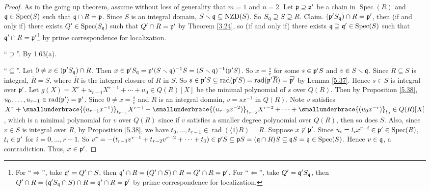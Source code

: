 \begin{proof}
    As in the going up theorem, assume without loss of generality that $m = 1$ and $n = 2$. Let $\mathfrak{p} \supseteq \mathfrak{p}'$ be a chain in $\operatorname{Spec}(R)$ and $\mathfrak{q} \in \operatorname{Spec}(S)$ such that $\mathfrak{q} \cap R = \mathfrak{p}$. Since $S$ is an integral domain, $S \smallsetminus \mathfrak{q} \subseteq \operatorname{NZD}(S)$. So $S_{\mathfrak{q}} \supseteq S \supseteq R$. Claim. $(\mathfrak{p}'S_{\mathfrak{q}}) \cap R = \mathfrak{p}'$, then (if and only if) there exists $Q' \in \operatorname{Spec}(S_{\mathfrak{q}})$ such that $Q' \cap R = \mathfrak{p}'$ by Theorem \ref{3.24}, so (if and only if) there exists $\mathfrak{q} \supseteq \mathfrak{q}' \in \operatorname{Spec}(S)$ such that $\mathfrak{q}' \cap R = \mathfrak{p}'$\footnote[2]{For ``$\Rightarrow$'', take $\mathfrak{q}' = Q' \cap S$, then $\mathfrak{q}' \cap R = (Q' \cap S) \cap R = Q' \cap R = \mathfrak{p}'$. For ``$\Leftarrow$'', take $Q' = \mathfrak{q}' S_{\mathfrak{q}}$, then $Q' \cap R = (\mathfrak{q}'S_{\mathfrak{q}} \cap S) \cap R = \mathfrak{q}' \cap R = \mathfrak{p}'$ by prime correspondence for localization.} by prime correspondence for localization. \par
    ``$\supseteq$''. By 1.63(a). \par
    ``$\subseteq$''. Let $0 \neq x \in (\mathfrak{p}'S_{\mathfrak{q}}) \cap R$. Then $x \in \mathfrak{p}'S_{\mathfrak{q}} = \mathfrak{p}' (S \smallsetminus \mathfrak{q})^{-1}S = (S \smallsetminus \mathfrak{q})^{-1} (\mathfrak{p}'S)$. So $x = \frac{s}{v}$ for some $s \in \mathfrak{p}'S$ and $v \in S \smallsetminus \mathfrak{q}$. Since $R \subseteq S$ is integral, $\overbar{R} = S$, where $\overbar{R}$ is the integral closure of $R$ in $S$. So $s \in \ffp'S \subseteq \operatorname{rad}(\ffp'S) = \operatorname{rad}(\ffp'\overbar{R}) = \overbar{\ffp'}$ by Lemma \ref{5.37}. Hence $s \in S$ is integral over $\mathfrak{p}'$. Let $g(X) = X^{r} + u_{r-1}X^{r-1} + \cdots + u_0 \in Q(R)[X]$ be the minimal polynomial of $s$ over $Q(R)$. Then by Proposition \ref{5.38}, $u_0,\ldots,u_{r-1} \in \operatorname{rad}(\mathfrak{p}') = \mathfrak{p}'$. Since $0 \neq x = \frac{s}{v}$ and $R$ is an integral domain, $v = sx^{-1}$ in $Q(R)$. Note $v$ satisfies $X^{r} + \smallunderbrace{(u_{r-1}x^{-1})}_{t_{r-1}} X^{r-1} + \smallunderbrace{(u_{r-2}x^{-2})}_{t_{r-2}}X^{r-2} + \cdots + \smallunderbrace{(u_0x^{-r})}_{t_0} \in Q(R)[X]$, which is a minimal polynomial for $v$ over $Q(R)$ since if $v$ satisfies a smaller degree polynomial over $Q(R)$, then so does $S$. Also, since $v \in S$ is integral over $R$, by Proposition \ref{5.38}, we have $t_0,\ldots,t_{r-1} \in \operatorname{rad}(\langle 1 \rangle R) = R$. Suppose $x \not\in \mathfrak{p}'$. Since $u_i = t_{i}x^{r-i} \in \mathfrak{p}' \in \operatorname{Spec}(R)$, $t_i \in \mathfrak{p}'$ for $i = 0,\ldots,r-1$. So $v^{r} = -(t_{r-1}v^{r-1} + t_{r-2}v^{r-2} + \cdots + t_0) \in \mathfrak{p}'S \subseteq \mathfrak{p} S = (\mathfrak{q} \cap R)S \subseteq \mathfrak{q} S = \mathfrak{q} \in \operatorname{Spec}(S)$. Hence $v \in \mathfrak{q}$, a contradiction. Thus, $x \in \mathfrak{p}'$.
\end{proof}

